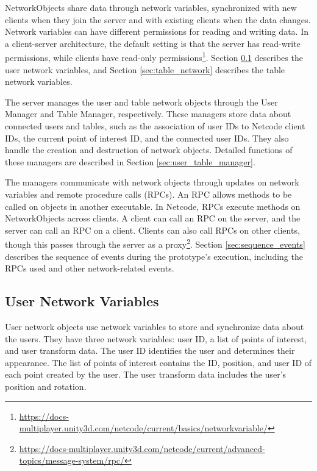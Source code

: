     NetworkObjects share data through network variables, synchronized with new clients when they join the server and with existing clients when the data changes. Network variables can have different permissions for reading and writing data. In a client-server architecture, the default setting is that the server has read-write permissions, while clients have read-only permissions\footnote{\url{https://docs-multiplayer.unity3d.com/netcode/current/basics/networkvariable/}}. Section \ref{sec:user_network} describes the user network variables, and Section \ref{sec:table_network} describes the table network variables.

    The server manages the user and table network objects through the User Manager and Table Manager, respectively. These managers store data about connected users and tables, such as the association of user IDs to Netcode client IDs, the current point of interest ID, and the connected user IDs. They also handle the creation and destruction of network objects. Detailed functions of these managers are described in Section \ref{sec:user_table_manager}.

    The managers communicate with network objects through updates on network variables and remote procedure calls (RPCs). An RPC allows methods to be called on objects in another executable. In Netcode, RPCs execute methods on NetworkObjects across clients. A client can call an RPC on the server, and the server can call an RPC on a client. Clients can also call RPCs on other clients, though this passes through the server as a proxy\footnote{\url{https://docs-multiplayer.unity3d.com/netcode/current/advanced-topics/message-system/rpc/}}. Section \ref{sec:sequence_events} describes the sequence of events during the prototype's execution, including the RPCs used and other network-related events.

    \subsection{User Network Variables} \label{sec:user_network}

        User network objects use network variables to store and synchronize data about the users. They have three network variables: user ID, a list of points of interest, and user transform data. The user ID identifies the user and determines their appearance. The list of points of interest contains the ID, position, and user ID of each point created by the user. The user transform data includes the user's position and rotation.

